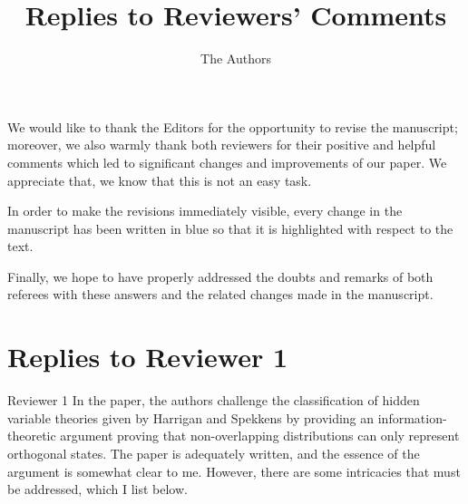 \documentclass[11pt, executivepaper]{article}
\begin{document}
\title{\textbf{Replies to Reviewers' Comments}}

\author{The Authors}

\maketitle


\noindent We would like to thank the Editors for the opportunity to revise the manuscript; moreover, we also warmly thank both reviewers for their positive and helpful comments which led to significant changes and improvements of our paper. We appreciate that, we know that this is not an easy task.
\vspace{2mm}

In order to make the revisions immediately visible, every change in the manuscript has been written in blue so that it is highlighted with respect to the text. 
\vspace{2mm}

Finally, we hope to have properly addressed the doubts and remarks of both referees with these answers and the related changes made in the manuscript.

\section{Replies to Reviewer 1}

Reviewer 1
In the paper, the authors challenge the classification of hidden variable theories given by Harrigan and Spekkens by providing an information-theoretic argument proving that non-overlapping distributions can only represent orthogonal states. The paper is adequately written, and the essence of the argument is somewhat clear to me. However, there are some intricacies that must be addressed, which I list below.
\end{document}
